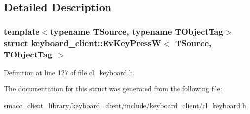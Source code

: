 \subsection{Detailed Description}
\subsubsection*{template$<$typename T\+Source, typename T\+Object\+Tag$>$\newline
struct keyboard\+\_\+client\+::\+Ev\+Key\+Press\+W$<$ T\+Source, T\+Object\+Tag $>$}



Definition at line 127 of file cl\+\_\+keyboard.\+h.



The documentation for this struct was generated from the following file\+:\begin{DoxyCompactItemize}
\item 
smacc\+\_\+client\+\_\+library/keyboard\+\_\+client/include/keyboard\+\_\+client/\hyperlink{cl__keyboard_8h}{cl\+\_\+keyboard.\+h}\end{DoxyCompactItemize}
